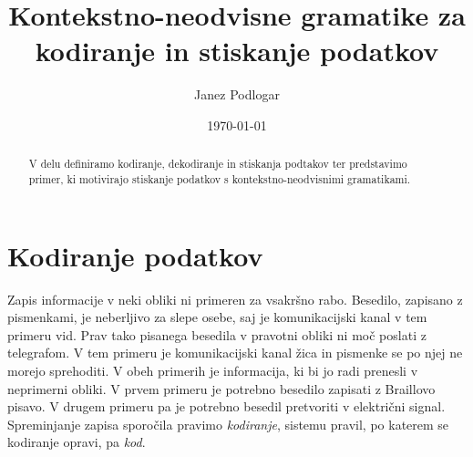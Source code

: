 \documentclass{amsart}
\title{Kontekstno-neodvisne gramatike za kodiranje in stiskanje podatkov}
\author{Janez Podlogar}
\date{\today}
\theoremstyle{definition} %
\theoremstyle{plain} %
\begin{document}
\begin{abstract}

    V delu definiramo kodiranje, dekodiranje in stiskanja podtakov ter predstavimo
    primer, ki motivirajo stiskanje podatkov s kontekstno-neodvisnimi gramatikami.

\end{abstract}

\maketitle

\section{Kodiranje podatkov}

Zapis informacije v neki obliki ni primeren za vsakršno rabo. Besedilo, zapisano z 
pismenkami, je neberljivo za slepe osebe, saj je komunikacijski kanal v tem primeru
vid. Prav tako pisanega besedila v pravotni obliki ni moč poslati z telegrafom. V tem
primeru je komunikacijski kanal žica in pismenke se po njej ne morejo sprehoditi. V obeh 
primerih je informacija, ki bi jo radi prenesli v neprimerni obliki. V prvem 
primeru je potrebno besedilo zapisati z Braillovo pisavo. V drugem primeru pa je 
potrebno besedil pretvoriti v električni signal. Spreminjanje zapisa sporočila
pravimo \textit{kodiranje}, sistemu pravil, po katerem se kodiranje opravi,
pa \textit{kod}. 
\end{document}
